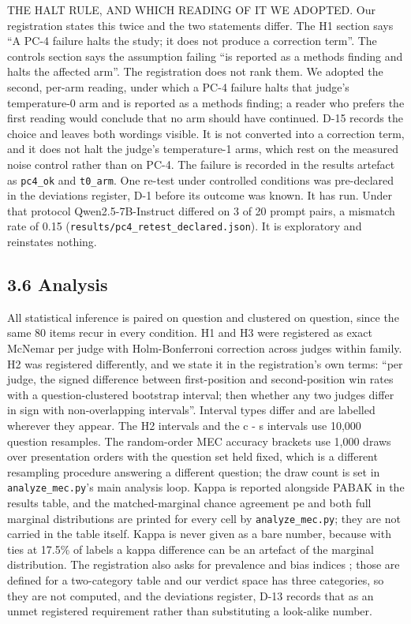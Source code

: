 THE HALT RULE, AND WHICH READING OF IT WE ADOPTED. Our registration states this twice and the two
statements differ. The H1 section says ``A PC-4 failure halts the study; it does not produce a
correction term''. The controls section says the assumption failing ``is reported as a methods
finding and halts the affected arm''. The registration does not rank them. We adopted the second,
per-arm reading, under which a PC-4 failure halts that judge's temperature-0 arm and is reported as
a methods finding; a reader who prefers the first reading would conclude that no arm should have
continued. D-15 records the choice and leaves both wordings visible. It is not converted into a correction term, and it does not halt the judge's temperature-1
arms, which rest on the measured noise control rather than on PC-4. The failure is recorded in the
results artefact as \texttt{pc4\_ok} and \texttt{t0\_arm}. One re-test under controlled conditions was pre-declared
in the deviations register, D-1 before its outcome was known. It has run. Under that protocol
Qwen2.5-7B-Instruct differed on 3 of 20 prompt pairs, a mismatch rate of 0.15
(\texttt{results/pc4\_retest\_declared.json}). It is exploratory and reinstates nothing.

\subsection{3.6 Analysis}\label{analysis}

All statistical inference is paired on question and clustered on question, since the same 80 items recur in
every condition. H1 and H3 were registered as exact McNemar per judge with Holm-Bonferroni
correction across judges within family. H2 was registered differently, and we state it in the
registration's own terms: ``per judge, the signed difference between first-position and
second-position win rates with a question-clustered bootstrap interval; then whether any two judges
differ in sign with non-overlapping intervals''. Interval types differ and are labelled wherever they appear. The H2 intervals and the c - s
intervals use 10,000 question resamples. The random-order MEC accuracy brackets use 1,000 draws
over presentation orders with the question set held fixed, which is a different resampling
procedure answering a different question; the draw count is set in \texttt{analyze\_mec.py}'s main
analysis loop. Kappa is reported alongside PABAK in the results table, and the matched-marginal
chance agreement pe and both full marginal distributions are printed for every cell by
\texttt{analyze\_mec.py}; they are not carried in the table itself. Kappa is never given as a bare
number, because with ties at 17.5\% of labels a kappa difference can be an artefact of the marginal
distribution. The registration also asks for prevalence and bias indices \autocite{byrt1993}; those are defined for a
two-category table and our verdict space has three categories, so they are not computed, and
the deviations register, D-13 records that as an unmet registered requirement rather than substituting a
look-alike number.

